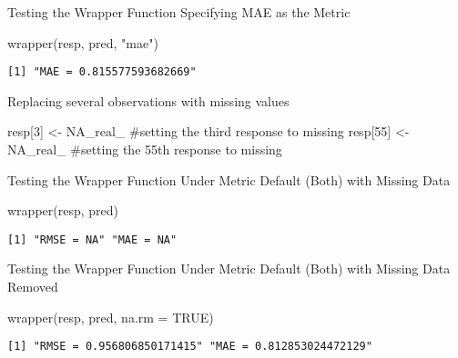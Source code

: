 \documentclass[
  letterpaper,
  DIV=11,
  numbers=noendperiod]{scrartcl}
\newenvironment{Shaded}{\begin{snugshade}}{\end{snugshade}}
\newcommand{\AttributeTok}[1]{\textcolor[rgb]{0.40,0.45,0.13}{#1}}
\newcommand{\CommentTok}[1]{\textcolor[rgb]{0.37,0.37,0.37}{#1}}
\newcommand{\ConstantTok}[1]{\textcolor[rgb]{0.56,0.35,0.01}{#1}}
\newcommand{\DecValTok}[1]{\textcolor[rgb]{0.68,0.00,0.00}{#1}}
\newcommand{\FunctionTok}[1]{\textcolor[rgb]{0.28,0.35,0.67}{#1}}
\newcommand{\NormalTok}[1]{\textcolor[rgb]{0.00,0.23,0.31}{#1}}
\newcommand{\OtherTok}[1]{\textcolor[rgb]{0.00,0.23,0.31}{#1}}
\newcommand{\StringTok}[1]{\textcolor[rgb]{0.13,0.47,0.30}{#1}}
\begin{document}
Testing the Wrapper Function Specifying MAE as the Metric

\begin{Shaded}
\begin{Highlighting}[]
\FunctionTok{wrapper}\NormalTok{(resp, pred, }\StringTok{"mae"}\NormalTok{)}
\end{Highlighting}
\end{Shaded}

\begin{verbatim}
[1] "MAE = 0.815577593682669"
\end{verbatim}

Replacing several observations with missing values

\begin{Shaded}
\begin{Highlighting}[]
\NormalTok{resp[}\DecValTok{3}\NormalTok{] }\OtherTok{\textless{}{-}} \ConstantTok{NA\_real\_} \CommentTok{\#setting the third response to missing}
\NormalTok{resp[}\DecValTok{55}\NormalTok{] }\OtherTok{\textless{}{-}} \ConstantTok{NA\_real\_} \CommentTok{\#setting the 55th response to missing}
\end{Highlighting}
\end{Shaded}

Testing the Wrapper Function Under Metric Default (Both) with Missing
Data

\begin{Shaded}
\begin{Highlighting}[]
\FunctionTok{wrapper}\NormalTok{(resp, pred)}
\end{Highlighting}
\end{Shaded}

\begin{verbatim}
[1] "RMSE = NA" "MAE = NA" 
\end{verbatim}

Testing the Wrapper Function Under Metric Default (Both) with Missing
Data Removed

\begin{Shaded}
\begin{Highlighting}[]
\FunctionTok{wrapper}\NormalTok{(resp, pred, }\AttributeTok{na.rm =} \ConstantTok{TRUE}\NormalTok{)}
\end{Highlighting}
\end{Shaded}

\begin{verbatim}
[1] "RMSE = 0.956806850171415" "MAE = 0.812853024472129" 
\end{verbatim}
\end{document}
